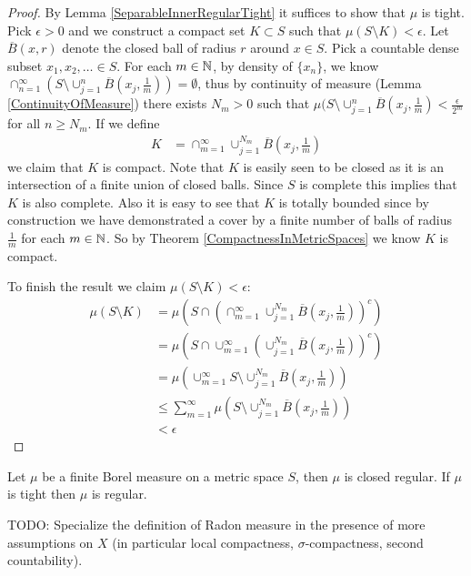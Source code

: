 \begin{proof}
By Lemma \ref{SeparableInnerRegularTight} it suffices to show that $\mu$ is tight.  Pick
$\epsilon > 0$ and we construct a compact set $K \subset S$ such that
$\mu(S \setminus K) < \epsilon$.  Let
$\overline{B}(x,r)$ denote the closed ball of radius $r$ around $x \in
S$.  Pick
a countable dense subset $x_1, x_2, \dotsc \in S$.  For each $m \in
\mathbb{N}$, by density of $\lbrace x_n \rbrace$, we know $\cap_{n=1}^\infty \left ( S
\setminus \cup_{j=1}^n \overline{B}(x_j, \frac{1}{m}) \right ) =
\emptyset$, thus by
continuity of measure (Lemma \ref{ContinuityOfMeasure}) there exists
$N_m > 0$ such that $\mu(S
\setminus \cup_{j=1}^n \overline{B}(x_j, \frac{1}{m}) < \frac{\epsilon}{2^m}$ for
all $n \geq N_m$.
If we define
\begin{align*}
K &= \cap_{m=1}^\infty \cup_{j=1}^{N_m} \overline{B}(x_j, \frac{1}{m})
\end{align*}
we claim that $K$ is compact.  Note that $K$ is easily seen to be
closed as it is an intersection of a finite union of closed balls.
Since $S$ is complete this implies that $K$ is also complete.  Also it
is easy to see that $K$ is totally bounded since by construction we
have demonstrated a cover by a finite number of balls of radius
$\frac{1}{m}$ for each $m \in \mathbb{N}$.  So by Theorem
\ref{CompactnessInMetricSpaces} we know $K$ is compact.

To finish the result we claim $\mu(S \setminus K) < \epsilon$:
\begin{align*}
\mu(S \setminus K) 
&= \mu(S \cap \left(\cap_{m=1}^\infty
  \cup_{j=1}^{N_m} \overline{B}(x_j, \frac{1}{m})\right)^c) \\
&= \mu(S \cap \cup_{m=1}^\infty \left(
  \cup_{j=1}^{N_m} \overline{B}(x_j, \frac{1}{m})\right)^c) \\
&= \mu(\cup_{m=1}^\infty S \setminus 
  \cup_{j=1}^{N_m} \overline{B}(x_j, \frac{1}{m})) \\
&\leq \sum_{m=1}^\infty \mu( S \setminus 
  \cup_{j=1}^{N_m} \overline{B}(x_j, \frac{1}{m})) \\
&< \epsilon
\end{align*}
\end{proof}

\begin{thm}Let $\mu$ be a finite Borel measure on a metric space $S$,
  then $\mu$ is closed regular.  If $\mu$ is tight then $\mu$ is regular.
\end{thm}
TODO: Specialize the definition of Radon measure in the presence of
more assumptions on $X$ (in particular local compactness,
$\sigma$-compactness, second countability).

